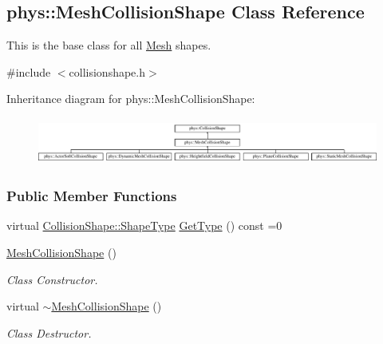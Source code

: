 \hypertarget{classphys_1_1MeshCollisionShape}{
\subsection{phys::MeshCollisionShape Class Reference}
\label{classphys_1_1MeshCollisionShape}
}


This is the base class for all \hyperlink{classphys_1_1Mesh}{Mesh} shapes.  




{\ttfamily \#include $<$collisionshape.h$>$}

Inheritance diagram for phys::MeshCollisionShape:\begin{figure}[H]
\begin{center}
\leavevmode
\includegraphics[height=1.548387cm]{classphys_1_1MeshCollisionShape}
\end{center}
\end{figure}
\subsubsection*{Public Member Functions}
\begin{DoxyCompactItemize}
\item 
virtual \hyperlink{classphys_1_1CollisionShape_af3ba4fd8af5b9557f912d2f5ff35a588}{CollisionShape::ShapeType} \hyperlink{classphys_1_1MeshCollisionShape_abc9d3f06df71eadb59ba93eadf6ab82f}{GetType} () const =0
\item 
\hypertarget{classphys_1_1MeshCollisionShape_aa5c09ce9f67166594ee43374485734c3}{
\hyperlink{classphys_1_1MeshCollisionShape_aa5c09ce9f67166594ee43374485734c3}{MeshCollisionShape} ()}
\label{classphys_1_1MeshCollisionShape_aa5c09ce9f67166594ee43374485734c3}

\begin{DoxyCompactList}\small\item\em Class Constructor. \item\end{DoxyCompactList}\item 
\hypertarget{classphys_1_1MeshCollisionShape_af9eff2a316fcf981954913708bf69231}{
virtual \hyperlink{classphys_1_1MeshCollisionShape_af9eff2a316fcf981954913708bf69231}{$\sim$MeshCollisionShape} ()}
\label{classphys_1_1MeshCollisionShape_af9eff2a316fcf981954913708bf69231}

\begin{DoxyCompactList}\small\item\em Class Destructor. \item\end{DoxyCompactList}\end{DoxyCompactItemize}
